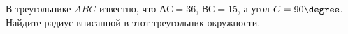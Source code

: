 \begin{ex}
	\begin{condition}
		В треугольнике \( ABC  \) известно, что \( АС = 36 \), \( ВС = 15 \), а угол \( C=90 \degree \). Найдите радиус вписанной в этот треугольник окружности.
	\end{condition}
\end{ex}